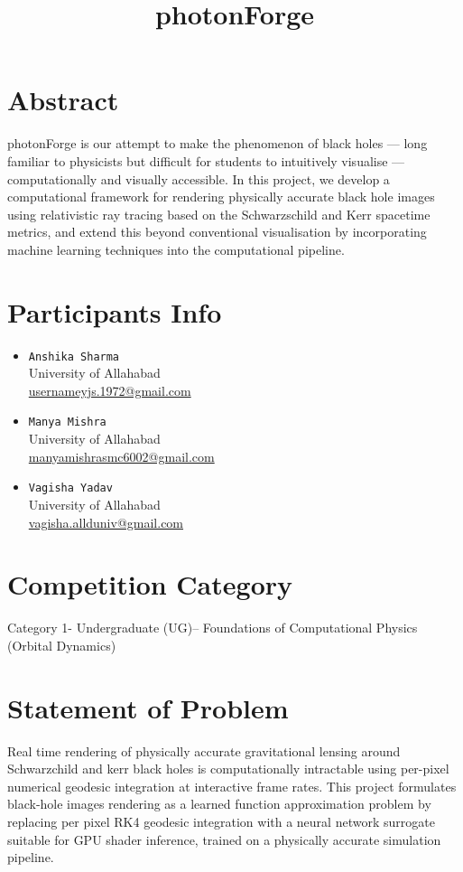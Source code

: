 \documentclass[12pt]{article}
\title{\Huge \textbf{photonForge}}
\begin{document}
\maketitle

\section{Abstract}
photonForge is our attempt to make the phenomenon of black holes — long familiar to physicists but difficult for students to intuitively visualise — computationally and visually accessible. In this project, we develop a computational framework for rendering physically accurate black hole images using relativistic ray tracing based on the Schwarzschild and Kerr spacetime metrics, and extend this beyond conventional visualisation by incorporating machine learning techniques into the computational pipeline.

\section{Participants Info}

\begin{itemize}
    \item \texttt{Anshika Sharma}\\
    University of Allahabad\\
    \href{mail :usernameyjs.1972@gmail.com}{usernameyjs.1972@gmail.com}

    \item \texttt{Manya Mishra}\\
    University of Allahabad\\
    \href{mail :manyamishrasmc6002@gmail.com}{manyamishrasmc6002@gmail.com}

    \item \texttt{Vagisha Yadav}\\
    University of Allahabad\\
    \href{mail :vagisha.allduniv@gmail.com}{vagisha.allduniv@gmail.com}
\end{itemize}




\section{Competition Category}
Category 1- Undergraduate (UG)– Foundations of Computational Physics (Orbital Dynamics)
\newpage
\section{Statement of Problem}
Real time rendering of physically accurate gravitational lensing around Schwarzchild and kerr black holes is computationally intractable using per-pixel numerical geodesic integration at interactive frame rates. This project formulates black-hole images rendering as a learned function approximation problem by replacing per pixel RK4 geodesic integration with a neural network surrogate suitable for GPU shader inference, trained on a physically accurate simulation pipeline.
\end{document}

